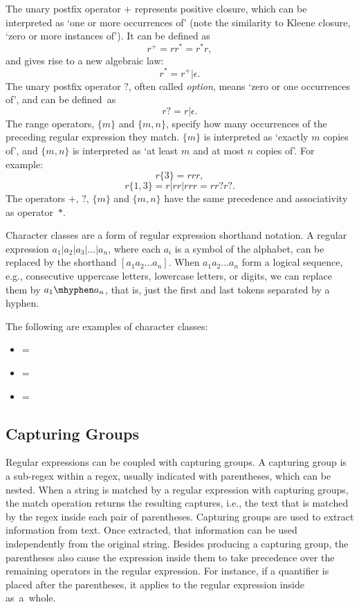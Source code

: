 The unary postfix operator \(+\) represents positive closure, which can be interpreted as `one or more occurrences of' (note the similarity to Kleene closure, `zero or more instances of'). It can be defined as
\[r^+ = rr^* = r^*r,\]
and gives rise to a new algebraic law:
\[r^* = r^+|\epsilon.\]
%
The unary postfix operator \(?\), often called \textit{option}, means `zero or one
occurrences of', and can be defined~as
\[ r? = r|\epsilon. \]
%
The range operators, \(\{m\}\) and \(\{m,n\}\), specify how many occurrences of the preceding regular expression they match. \(\{m\}\) is interpreted as `exactly \(m\) copies of', and \(\{m,n\}\) is interpreted as `at least \(m\) and at most \(n\) copies of'. For example:
\[r\{3\} = rrr,\]
\[r\{1,3\} = r|rr|rrr = rr?r?.\]
%
The operators \(+\), \(?\), \(\{m\}\) and \(\{m,n\}\) have the same precedence and associativity as operator~\(*\).


Character classes are a form of regular expression shorthand notation. A regular expression \(a_1|a_2|a_3|...|a_n\), where each \(a_i\) is a symbol of the alphabet, can be replaced by the shorthand \([a_1 a_2...a_n]\).
When \(a_1 a_2...a_n\) form a logical sequence, e.g., consecutive uppercase letters, lowercase letters, or digits, we
can replace them by \(a_1\mhyphen a_n\), that is, just the first and last tokens separated by
a hyphen.


\begin{example}
The following are examples of character classes:
\begin{itemize}
\item \regex{[abc]} = 
\item \regex{[a\mhyphen z]} = 
\item {} = 
\end{itemize}
\end{example}

\subsection{Capturing Groups}

Regular expressions can be coupled with capturing groups.
%
A capturing group is a sub-regex within a regex, usually indicated with parentheses, which can be nested. When a string is matched by a regular expression with capturing groups, the match operation returns the resulting captures, i.e., the text that is matched by the regex inside each pair of parentheses. Capturing groups are used to extract information from text. Once extracted, that information can be used independently from the original string.
Besides producing a capturing group, the parentheses also cause the expression inside them to take precedence over the remaining operators in the regular expression.
For instance, if a quantifier is placed after the parentheses, it applies to the regular expression inside as~a~whole.

